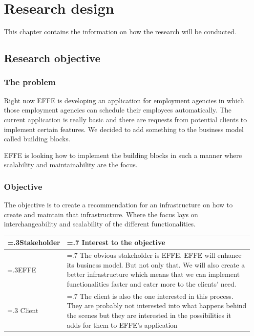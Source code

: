 
\chapter{Research design}
This chapter contains the information on how the research will be conducted.

\section{Research objective}

\subsection{The problem}
Right now EFFE is developing an application for employment agencies in which those employment agencies can schedule their employees automatically. The current application is really basic and there are requests from potential clients to implement certain features. We decided to add something to the business model called building blocks.


EFFE is looking how to implement the building blocks in such a manner where scalability and maintainability are the focus.

\subsection{Objective}
The objective is to create a recommendation for an infrastructure on how to create and maintain that infrastructure. Where the focus lays on interchangeability and scalability of the different functionalities.

\begin{tabularx}{\linewidth}{|>{\hsize=.3\hsize}X|
		>{\hsize=.7\hsize}X|}
	\hline
	Stakeholder &
	Interest to the objective
	\\
	\hline
	EFFE &
	The obvious stakeholder is EFFE. EFFE will enhance its business model. But not only that. We will also create a better infrastructure which means that we can implement functionalities faster and cater more to the clients’ need.
	\\
	\hline
	Client &
	The client is also the one interested in this process. They are probably not interested into what happens behind the scenes but they are interested in the possibilities it adds for them to EFFE’s application
	\\
	\hline
\end{tabularx}


